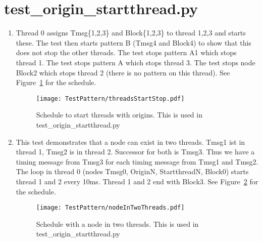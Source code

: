 \documentclass[12pt,a4paper]{report}
\begin{document}
\section{test\_origin\_startthread.py}
\begin{enumerate}
\item Thread 0 assigns Tmsg\{1,2,3\} and Block\{1,2,3\} to thread 1,2,3 and starts these.
The test then starts pattern B (Tmsg4 and Block4) to show that this does not stop the other threads.
The test stops pattern A1 which stops thread 1.
The test stops pattern A which stops thread 3.
The test stops node Block2 which stops thread 2 (there is no pattern on this thread).
See Figure~\ref{fig:schedule_origin_startthreads} for the schedule.
    \begin{figure}
        \centering
        \texttt{[image: TestPattern/threadsStartStop.pdf]}
        \caption{Schedule to start threads with origins. This is used in test\_origin\_startthread.py}
        \label{fig:schedule_origin_startthreads}
    \end{figure}
\item This test demonstrates that a node can exist in two threads.
Tmsg1 ist in thread 1, Tmsg2 is in thread 2. Successor for both is Tmsg3.
Thus we have a timing message from Tmsg3 for each timing message from Tmsg1 and Tmsg2.
The loop in thread 0 (nodes Tmsg0, OriginN, StartthreadN, Block0) starts
thread 1 and 2 every 10ms. Thread 1 and 2 end with Block3.
See Figure~\ref{fig:schedule_nodeInTwoThreads} for the schedule.
    \begin{figure}
        \centering
        \texttt{[image: TestPattern/nodeInTwoThreads.pdf]}
        \caption{Schedule with a node in two threads. This is used in test\_origin\_startthread.py}
        \label{fig:schedule_nodeInTwoThreads}
    \end{figure}
\end{enumerate}
\end{document}
